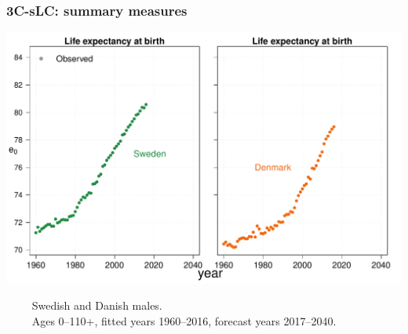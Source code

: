\documentclass[12pt, xcolor=table]{beamer}  %
\begin{document}
%	
%	
%	

\begin{frame}\frametitle{3C-sLC: summary measures}

\vspace{-0.5cm}
	
	\begin{center}	
		\vspace{0.4cm}
		
		\includegraphics[scale=.42]{Figures/Ch5/F1_1_M}
		
	\end{center}

\vspace{-0.3cm}
\tiny{$\quad\quad$ Swedish and Danish males. \\ $\quad\quad$ Ages 0--110+, fitted years 1960--2016, forecast years 2017--2040.}
	
\end{frame}
\end{document}
